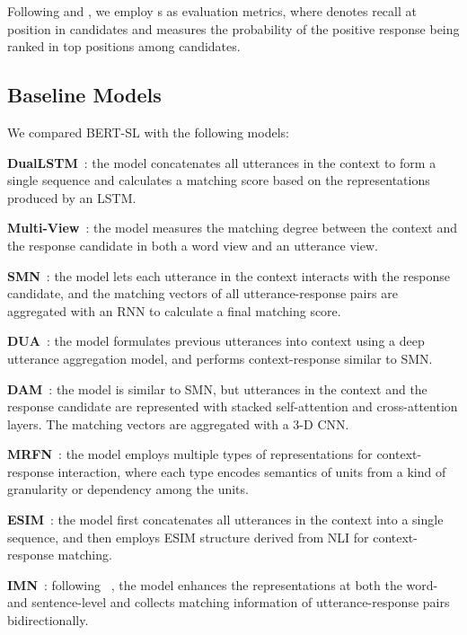 \documentclass{article}
\begin{document}
Following \citet{lowe-etal-2015-ubuntu} and \citet{zhang-etal-2018-modeling}, we employ s as evaluation metrics, where  denotes recall at position  in  candidates and measures the probability of the positive response being ranked in top  positions among  candidates.

\subsection{Baseline Models}
We compared BERT-SL with the following models:

\textbf{DualLSTM}~\cite{lowe-etal-2015-ubuntu}: 
 the model concatenates all utterances in the context to form a single sequence and calculates a matching score  based on the representations produced by an LSTM.
 
\textbf{Multi-View}~\cite{zhou-etal-2016-multi}:
 the model measures the matching degree between the context and the response candidate in both a word view and an utterance view.

\textbf{SMN}~\cite{wu-etal-2017-sequential}:
 the model lets each utterance in the context interacts with the response candidate, and the matching vectors of all utterance-response pairs are aggregated with an RNN to calculate a final matching score. 
 
\textbf{DUA}~\cite{zhang-etal-2018-modeling}: the model formulates previous utterances into context using a deep utterance aggregation model, and performs context-response similar to SMN.

\textbf{DAM}~\cite{zhou2018multi}: 
 the model is similar to SMN, but utterances in the context and the response candidate are represented with stacked self-attention and cross-attention layers. The matching vectors are aggregated with a 3-D CNN. 

\textbf{MRFN}~\cite{tao2019multi}:
 the model employs multiple types of representations for context-response interaction, where each type encodes semantics of units from a kind of granularity or dependency among the units.
 
\textbf{ESIM}~\cite{chen2019sequential}: the model first concatenates all utterances in the context into a single sequence, and then employs ESIM structure derived from NLI for context-response matching.

\textbf{IMN}~\cite{gu2019interactive}: following ~\citet{wu-etal-2017-sequential}, the model enhances the representations at both the word- and sentence-level and collects matching information of utterance-response pairs bidirectionally.
\end{document}
